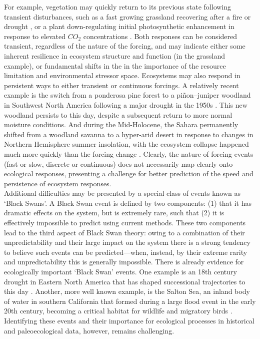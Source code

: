 \documentclass[11pt,a4paper,oneside]{article}
\begin{document}
For example, vegetation may quickly return to its previous state following transient disturbances, such as a fast growing grassland recovering after a fire or drought \citep[e.g.,][]{Weaver1936,albertson1944}, or a plant down-regulating initial photosynthetic enhancement in response to elevated $CO_{2}$ concentrations \citep{eatonrye2012}. Both responses can be considered transient, regardless of the nature of the forcing, and may indicate either some inherent resilience in ecosystem structure and function (in the grassland example), or fundamental shifts in the in the importance of the resource limitation and environmental stressor space. Ecosystems may also respond in persistent ways to either transient or continuous forcings. A relatively recent example is the switch from a ponderosa pine forest to a piñon–juniper woodland in Southwest North America following a major drought in the 1950s \citep{Allen1998}. This new woodland persists to this day, despite a subsequent return to more normal moisture conditions. And during the Mid-Holocene, the Sahara permanently shifted from a woodland savanna to a hyper-arid desert in response to changes in Northern Hemisphere summer insolation, with the ecosystem collapse happened much more quickly than the forcing change \citep{Foley2003}. Clearly, the nature of forcing events (fast or slow, discrete or continuous) does not necessarily map clearly onto ecological responses, presenting a challenge for better prediction of the speed and persistence of ecosystem responses.\\

Additional difficulties may be presented by a special class of events known as `Black Swans'. A Black Swan event is defined by two components: (1) that it has dramatic effects on the system, but is extremely rare, such that (2) it is effectively impossible to predict using current methods. These two components lead to the third aspect of Black Swan theory: owing to a combination of their unpredictability and their large impact on the system there is a strong tendency to believe such events can be predicted---when, instead, by their extreme rarity and unpredictability this is generally impossible. There is already evidence for ecologically important `Black Swan' events. One example is an 18th century drought in Eastern North America that has shaped successional trajectories to this day \citep{Pederson2014}. Another, more well known example, is the Salton Sea, an inland body of water in southern California that formed during a large flood event in the early 20th century, becoming a critical habitat for wildlife and migratory birds \citep{Cohn2000}. Identifying these events and their importance for ecological processes in historical and paleoecological data, however, remains challenging.\\ 
\end{document}
